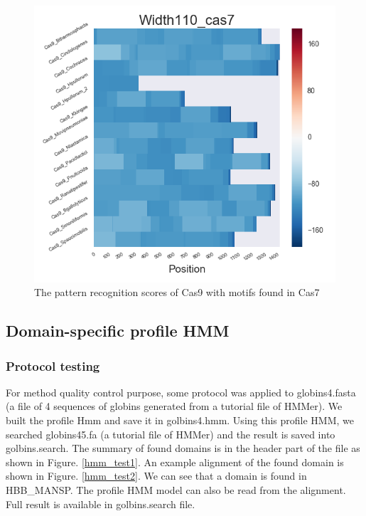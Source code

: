 \documentclass[11pt, oneside]{article}
\begin{document}
\begin{figure}[htbp]
\begin{minipage}{0.32\textwidth}
  \end{minipage}
  \hfill
  \begin{minipage}{0.32\textwidth}
    \centering
    \includegraphics[width=1\textwidth]{images/Width110_cas7_heatmap} %
  \end{minipage}
  \caption{The pattern recognition scores of Cas9 with motifs found in Cas7}
  \label{fig:cas7_recog}
\end{figure}


\subsection{Domain-specific profile HMM}

\subsubsection{Protocol testing}

For method quality control purpose, some protocol was applied to globins4.fasta (a file of 4 sequences of globins generated from a tutorial file of HMMer). We built the profile Hmm and save it in golbins4.hmm. Using this profile HMM, we searched globins45.fa (a tutorial file of HMMer) and the result is saved into golbins.search. The summary of found domains is in the header part of the file as shown in Figure. \ref{hmm_test1}.  An example alignment of the found domain is shown in Figure. \ref{hmm_test2}. We can see that a domain is found in HBB\_MANSP. The profile HMM model can also be read from the alignment. Full result is available in golbins.search file.
\end{document}
